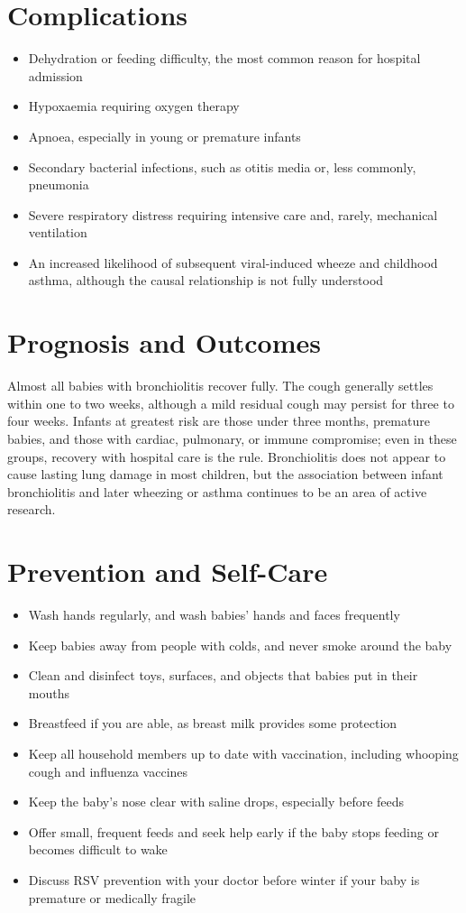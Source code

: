 \section*{Complications}
\begin{itemize}
    \item Dehydration or feeding difficulty, the most common reason for hospital admission
    \item Hypoxaemia requiring oxygen therapy
    \item Apnoea, especially in young or premature infants
    \item Secondary bacterial infections, such as otitis media or, less commonly, pneumonia
    \item Severe respiratory distress requiring intensive care and, rarely, mechanical ventilation
    \item An increased likelihood of subsequent viral-induced wheeze and childhood asthma, although the causal relationship is not fully understood
\end{itemize}

\section*{Prognosis and Outcomes}
Almost all babies with bronchiolitis recover fully. The cough generally settles within one to two weeks, although a mild residual cough may persist for three to four weeks. Infants at greatest risk are those under three months, premature babies, and those with cardiac, pulmonary, or immune compromise; even in these groups, recovery with hospital care is the rule. Bronchiolitis does not appear to cause lasting lung damage in most children, but the association between infant bronchiolitis and later wheezing or asthma continues to be an area of active research.

\section*{Prevention and Self-Care}
\begin{itemize}
    \item Wash hands regularly, and wash babies' hands and faces frequently
    \item Keep babies away from people with colds, and never smoke around the baby
    \item Clean and disinfect toys, surfaces, and objects that babies put in their mouths
    \item Breastfeed if you are able, as breast milk provides some protection
    \item Keep all household members up to date with vaccination, including whooping cough and influenza vaccines
    \item Keep the baby's nose clear with saline drops, especially before feeds
    \item Offer small, frequent feeds and seek help early if the baby stops feeding or becomes difficult to wake
    \item Discuss RSV prevention with your doctor before winter if your baby is premature or medically fragile
\end{itemize}

